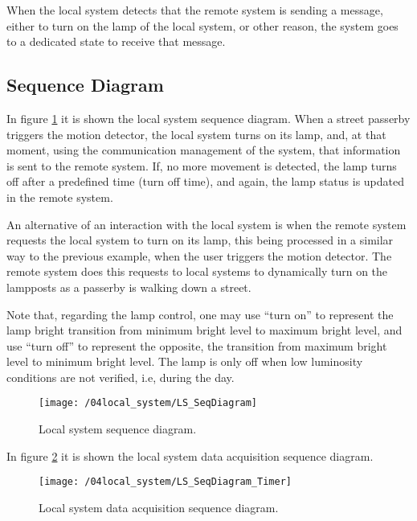 When the local system detects that the remote system is sending a message, either to turn on the lamp of the local system, or other reason, the system goes to a dedicated state to receive that message.

\subsection{Sequence Diagram}
In figure \ref{fig:ls_seq_diagram} it is shown the local system sequence diagram. When a street passerby triggers the motion detector, the local system turns on its lamp, and, at that moment, using the communication management of the system, that information is sent to the remote system. If, no more movement is detected, the lamp turns off after a predefined time (turn off time), and again, the lamp status is updated in the remote system.

An alternative of an interaction with the local system is when the remote system requests the local system to turn on its lamp, this being processed in a similar way to the previous example, when the user triggers the motion detector. The remote system does this requests to local systems to dynamically turn on the lampposts as a passerby is walking down a street.

Note that, regarding the lamp control, one may use “turn on” to represent the lamp bright transition from minimum bright level to maximum bright level, and use “turn off” to represent the opposite, the transition from maximum bright level to minimum bright level. The lamp is only off when low luminosity conditions are not verified, i.e, during the day.

\begin{figure}[H]
	\centering
	\texttt{[image: /04local\_system/LS\_SeqDiagram]}
	\caption{Local system sequence diagram.}
	\label{fig:ls_seq_diagram}
\end{figure}

In figure \ref{fig:ls_seq_diagram_timer} it is shown the local system data acquisition sequence diagram.

\begin{figure}[H]
	\centering
	\texttt{[image: /04local\_system/LS\_SeqDiagram\_Timer]}
	\caption{Local system data acquisition sequence diagram.}
	\label{fig:ls_seq_diagram_timer}
\end{figure}